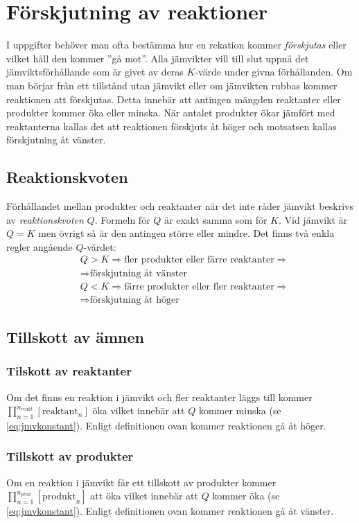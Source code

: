 \section{Förskjutning av reaktioner}

I uppgifter behöver man ofta bestämma hur en rekation kommer \emph{förskjutas} eller vilket håll den kommer ''gå mot''. Alla jämvikter vill till slut uppnå det jämviktsförhållande som är givet av deras $K$-värde under givna förhållanden. Om man börjar från ett tillstånd utan jämvikt eller om jämvikten rubbas kommer reaktionen att förskjutas. Detta innebär att antingen mängden reaktanter eller produkter kommer öka eller minska. När antalet produkter ökar jämfört med reaktanterna kallas det att reaktionen förskjuts åt höger och motsatsen kallas förskjutning åt vänster.

\subsection{Reaktionskvoten}

Förhållandet mellan produkter och reaktanter när det inte råder jämvikt beskrivs av \emph{reaktionskvoten} $Q$. Formeln för $Q$ är exakt samma som för $K$. Vid jämvikt är $Q=K$ men övrigt så är den antingen större eller mindre. Det finns två enkla regler angående $Q$-värdet:
\begin{align*}
    &Q > K \Rightarrow \text{fler produkter eller färre reaktanter} \Rightarrow \\ 
    &\Rightarrow \text{förskjutning åt vänster} \\
    &Q < K \Rightarrow \text{färre produkter eller fler reaktanter} \Rightarrow \\ 
    &\Rightarrow \text{förskjutning åt höger}
\end{align*}

\subsection{Tillskott av ämnen}
\subsubsection[Reaktanter]{Tilskott av reaktanter}
Om det finns en reaktion i jämvikt och fler reaktanter läggs till kommer $\prod^{n_{reakt}}_{n=1}[\mathrm{reaktant}_n]$ öka vilket innebär att $Q$ kommer minska (se \cref{eq:jmvkonstant}). Enligt definitionen ovan kommer reaktionen gå åt höger.
\subsubsection[Produkter]{Tillskott av produkter}
Om en reaktion i jämvikt får ett tillskott av produkter kommer $\prod^{n_{prod}}_{n=1}[\mathrm{produkt}_n]$ att öka vilket innebär att $Q$ kommer öka (se \cref{eq:jmvkonstant}). Enligt definitionen ovan kommer reaktionen gå åt vänster.